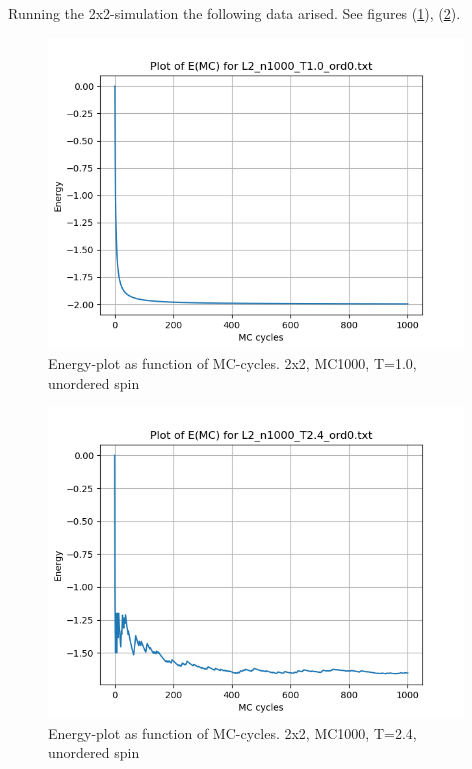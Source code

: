 \documentclass{article}
\begin{document}
Running the 2x2-simulation the following data arised. See figures (\ref{fig:energy_L2_n1000_T1.0_ord0}), (\ref{fig:energy_L2_n1000_T2.4_ord0}).

\begin{figure}[ht]
    \centering
    \includegraphics[width = 11cm]{img/energy_L2_n1000_T10_ord0.png}
    \caption{Energy-plot as function of MC-cycles. 2x2, MC1000, T=1.0, unordered spin}
    \label{fig:energy_L2_n1000_T1.0_ord0}
  \end{figure}

\begin{figure}[ht]
    \centering
    \includegraphics[width = 11cm]{img/energy_L2_n1000_T24_ord0.png}
    \caption{Energy-plot as function of MC-cycles. 2x2, MC1000, T=2.4, unordered spin}
    \label{fig:energy_L2_n1000_T2.4_ord0}
  \end{figure}
\end{document}
